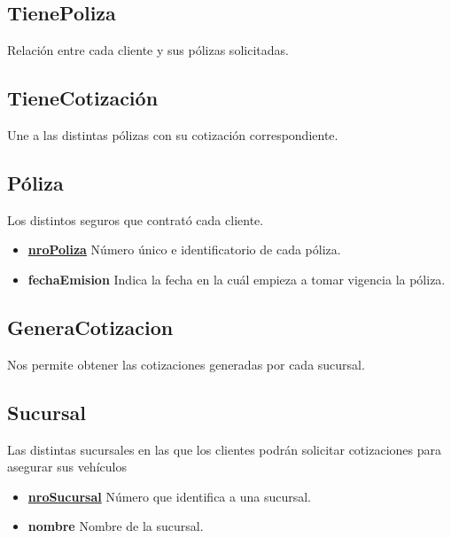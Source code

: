 \documentclass[a4paper,11pt]{article}
\begin{document}
\subsection{TienePoliza}

Relación entre cada cliente y sus pólizas solicitadas.

\subsection{TieneCotización}

Une a las distintas pólizas con su cotización correspondiente.

\subsection{Póliza}

Los distintos seguros que contrató cada cliente.

\begin{itemize}
   
  \item \textbf{\uline{nroPoliza}} Número único e identificatorio de cada póliza.
  	
  \item \textbf{fechaEmision} Indica la fecha en la cuál empieza a tomar vigencia la póliza.
      
\end{itemize}

\subsection{GeneraCotizacion}

Nos permite obtener las cotizaciones generadas por cada sucursal.

\subsection{Sucursal}

Las distintas sucursales en las que los clientes podrán solicitar cotizaciones para asegurar sus vehículos

\begin{itemize}
   
  \item \textbf{\uline{nroSucursal}} Número que identifica a una sucursal.
  
  \item \textbf{nombre} Nombre de la sucursal.
  
\end{itemize}
\end{document}
